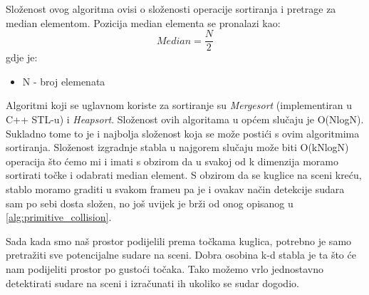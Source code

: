 Složenost ovog algoritma ovisi o složenosti operacije sortiranja i pretrage za median elementom. Pozicija median elementa se pronalazi kao:
\begin{equation}
	Median =\frac{N}{2}
\end{equation}
gdje je:
\begin{itemize}
	\item N - broj elemenata
\end{itemize}
Algoritmi koji se uglavnom koriste za sortiranje su \emph{Mergesort} (implementiran u C++ STL-u) i \emph{Heapsort}. Složenost ovih algoritama u općem slučaju je O(NlogN). Sukladno tome to je i najbolja složenost koja se može postići s ovim algoritmima sortiranja. Složenost izgradnje stabla u najgorem slučaju može biti O(kNlogN) operacija što ćemo mi i imati s obzirom da u svakoj od k dimenzija moramo sortirati točke i odabrati median element. S obzirom da se kuglice na sceni kreću, stablo moramo graditi u svakom frameu pa je i ovakav način detekcije sudara sam po sebi dosta složen, no još uvijek je brži od onog opisanog u \ref{alg:primitive_collision}. 

Sada kada smo naš prostor podijelili prema točkama kuglica, potrebno je samo pretražiti sve potencijalne sudare na sceni. Dobra osobina k-d stabla je ta što će nam podijeliti prostor po gustoći točaka. Tako možemo vrlo jednostavno detektirati sudare na sceni i izračunati ih ukoliko se sudar dogodio.

